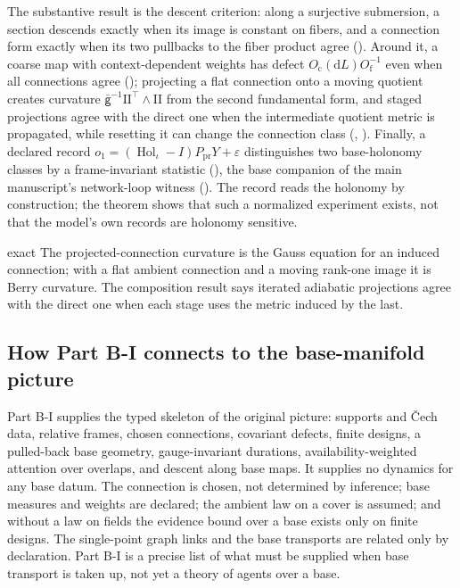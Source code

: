The substantive result is the descent criterion: along a surjective submersion, a section descends
exactly when its image is constant on fibers, and a connection form exactly when its two pullbacks to the
fiber product agree (). Around it, a coarse map with
context-dependent weights has defect \(O_{\mathrm c}(\mathrm dL)O_{\mathrm f}^{-1}\) even when all
connections agree (); projecting a flat connection onto a moving quotient
creates curvature \(\bar{\mathsf g}^{-1}\mathrm{II}^\top\wedge\mathrm{II}\) from the second fundamental form,
and staged projections agree with the direct one when the intermediate quotient metric is propagated,
while resetting it can change the connection class (,
). Finally, a declared record
\(o_1=(\operatorname{Hol}_\iota-I)P_{\mathrm{pr}}Y+\varepsilon\) distinguishes two base-holonomy classes by a
frame-invariant statistic (), the base companion of the main
manuscript's network-loop witness (). The record reads the holonomy
by construction; the theorem shows that such a normalized experiment exists, not that the model's own
records are holonomy sensitive.

\begin{analogy}{exact}
The projected-connection curvature is the Gauss equation for an induced connection; with a flat ambient
connection and a moving rank-one image it is Berry curvature. The composition result says iterated
adiabatic projections agree with the direct one when each stage uses the metric induced by the last.
\end{analogy}

\subsection{How Part B-I connects to the base-manifold picture}
\label{comp:sb-vision}

Part B-I supplies the typed skeleton of the original picture: supports and Čech data, relative frames,
chosen connections, covariant defects, finite designs, a pulled-back base geometry, gauge-invariant
durations, availability-weighted attention over overlaps, and descent along base maps. It supplies no
dynamics for any base datum. The connection is chosen, not determined by inference; base measures and
weights are declared; the ambient law on a cover is assumed; and without a law on fields the evidence
bound over a base exists only on finite designs. The single-point graph links and the base transports
are related only by declaration. Part B-I is a precise list of what must be supplied when base transport
is taken up, not yet a theory of agents over a base.

